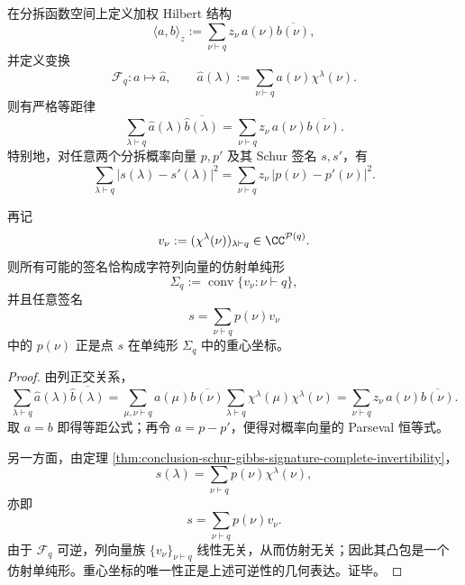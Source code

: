 \begin{theorem}\label{thm:conclusion-schur-signature-parseval-simplex}
在分拆函数空间上定义加权 Hilbert 结构
\[
\langle a,b\rangle_z:=\sum_{\nu\vdash q}z_\nu\,a(\nu)\overline{b(\nu)},
\]
并定义变换
\[
\mathcal F_q:a\longmapsto \widehat a,
\qquad
\widehat a(\lambda):=\sum_{\nu\vdash q}a(\nu)\chi^\lambda(\nu).
\]
则有严格等距律
\[
\sum_{\lambda\vdash q}\widehat a(\lambda)\overline{\widehat b(\lambda)}
=
\sum_{\nu\vdash q}z_\nu\,a(\nu)\overline{b(\nu)}.
\]
特别地，对任意两个分拆概率向量 \(p,p'\) 及其 Schur 签名 \(s,s'\)，有
\[
\sum_{\lambda\vdash q}|s(\lambda)-s'(\lambda)|^2
=
\sum_{\nu\vdash q}z_\nu\,|p(\nu)-p'(\nu)|^2.
\]

再记
\[
v_\nu:=(\chi^\lambda(\nu))_{\lambda\vdash q}\in \CC^{\mathcal P(q)}.
\]
则所有可能的签名恰构成字符列向量的仿射单纯形
\[
\Sigma_q:=\operatorname{conv}\{v_\nu:\nu\vdash q\},
\]
并且任意签名
\[
s=\sum_{\nu\vdash q}p(\nu)v_\nu
\]
中的 \(p(\nu)\) 正是点 \(s\) 在单纯形 \(\Sigma_q\) 中的重心坐标。
\end{theorem}
\begin{proof}
由列正交关系，
\[
\sum_{\lambda\vdash q}\widehat a(\lambda)\overline{\widehat b(\lambda)}
=
\sum_{\mu,\nu\vdash q}
a(\mu)\overline{b(\nu)}
\sum_{\lambda\vdash q}\chi^\lambda(\mu)\chi^\lambda(\nu)
=
\sum_{\nu\vdash q}z_\nu\,a(\nu)\overline{b(\nu)}.
\]
取 \(a=b\) 即得等距公式；再令 \(a=p-p'\)，便得对概率向量的 Parseval 恒等式。

另一方面，由定理 \ref{thm:conclusion-schur-gibbs-signature-complete-invertibility}，
\[
s(\lambda)=\sum_{\nu\vdash q}p(\nu)\chi^\lambda(\nu),
\]
亦即
\[
s=\sum_{\nu\vdash q}p(\nu)v_\nu.
\]
由于 \(\mathcal F_q\) 可逆，列向量族 \(\{v_\nu\}_{\nu\vdash q}\) 线性无关，从而仿射无关；因此其凸包是一个仿射单纯形。重心坐标的唯一性正是上述可逆性的几何表达。证毕。
\end{proof}

